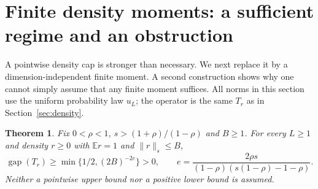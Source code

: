 \documentclass[11pt]{article}
\newtheorem{theorem}{Theorem}
\newcommand{\gap}{\operatorname{gap}}
\begin{document}
\section{Finite density moments: a sufficient regime and an obstruction}
\label{sec:finite-moment}
A pointwise density cap is stronger than necessary. We next replace it
by a dimension-independent finite moment. A second construction shows why
one cannot simply assume that any finite moment suffices. All norms in
this section use the uniform probability law $u_L$; the operator is the
same $T_r$ as in Section~\ref{sec:density}.

\begin{theorem}\label{thm:moment}
Fix $0<\rho<1$, $s>(1+\rho)/(1-\rho)$ and $B\ge1$. For every $L\ge1$
and density $r\ge0$ with $\mathbb E r=1$ and $\|r\|_s\le B$,
\[
 \gap(T_r)\ge\min\{1/2,(2B)^{-2e}\}>0,
 \qquad e=\frac{2\rho s}{(1-\rho)(s(1-\rho)-1-\rho)}.
\]
Neither a pointwise upper bound nor a positive lower bound is assumed.
\end{theorem}
\end{document}
